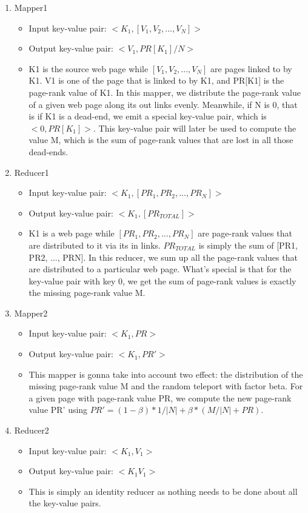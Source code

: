 \documentclass[a4paper]{article}
\begin{document}
\begin{enumerate}
	\item Mapper1
	\begin{itemize}
		\item Input key-value pair: $<K_1, [V_1, V_2, ..., V_N]>$
		\item Output key-value pair: $<V_1, PR[K_1] / N>$
		\item K1 is the source web page while $[V_1, V_2, ..., V_N]$ are pages linked to by K1. V1 is one of the page that is linked to by K1, and PR[K1] is the page-rank value of K1. In this mapper, we distribute the page-rank value of a given web page along its out links evenly. Meanwhile, if N is 0, that is if K1 is a dead-end, we emit a special key-value pair, which is $<0, PR[K_1]>$. This key-value pair will later be used to compute the value M, which is the sum of page-rank values that are lost in all those dead-ends.
	\end{itemize}
	
	\item Reducer1
	\begin{itemize}
		\item Input key-value pair: $<K_1, [PR_1, PR_2, ..., PR_N]>$
		\item Output key-value pair: $<K_1, [PR_{TOTAL}]>$
		\item K1 is a web page while $[PR_1, PR_2, ..., PR_N]$ are page-rank values that are distributed to it via its in links. $PR_{TOTAL}$ is simply the sum of [PR1, PR2, ..., PRN]. In this reducer, we sum up all the page-rank values that are distributed to a particular web page. What's special is that for the key-value pair with key 0, we get the sum of page-rank values is exactly the missing page-rank value M.
	\end{itemize}
		
	\item Mapper2
	\begin{itemize}
		\item Input key-value pair: $<K_1, PR> $
		\item Output key-value pair: $<K_1, PR'>$
		\item This mapper is gonna take into account two effect: the distribution of the missing page-rank value M and the random teleport with factor beta. For a given page with page-rank value PR, we compute the new page-rank value PR' using $PR' =  (1 - \beta) * 1 / |N| + \beta * (M / |N| + PR)$.
	\end{itemize}
	
	\item Reducer2
	\begin{itemize}
		\item Input key-value pair: $<K_1, V_1>$
		\item Output key-value pair: $<K_1 V_1>$
		\item This is simply an identity reducer as nothing needs to be done about all the key-value pairs. 
	\end{itemize}
	
\end{enumerate}
\end{document}
